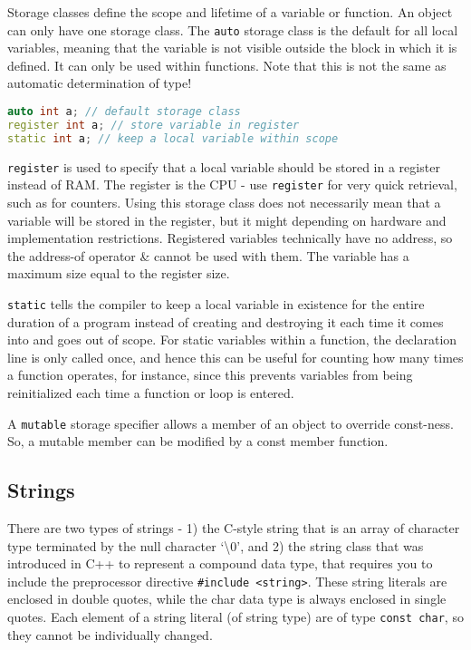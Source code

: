 \documentclass[10pt]{article}
\begin{document}
Storage classes define the scope and lifetime of a variable or function. An object can only have one storage class. The \texttt{auto} storage class is the default for all local variables, meaning that the variable is not visible outside the block in which it is defined. It can only be used within functions. Note that this is not the same as automatic determination of type!

\begin{lstlisting}[language=C++]
auto int a; // default storage class
register int a; // store variable in register
static int a; // keep a local variable within scope
\end{lstlisting}

\texttt{register} is used to specify that a local variable should be stored in a register instead of RAM. The register is the CPU - use \texttt{register} for very quick retrieval, such as for counters. Using this storage class does not necessarily mean that a variable will be stored in the register, but it might depending on hardware and implementation restrictions. Registered variables technically have no address, so the address-of operator \& cannot be used with them. The variable has a maximum size equal to the register size.

\texttt{static} tells the compiler to keep a local variable in existence for the entire duration of a program instead of creating and destroying it each time it comes into and goes out of scope. For static variables within a function, the declaration line is only called once, and hence this can be useful for counting how many times a function operates, for instance, since this prevents variables from being reinitialized each time a function or loop is entered.

A \texttt{mutable} storage specifier allows a member of an object to override const-ness. So, a mutable member can be modified by a const member function.

\subsection{Strings}

There are two types of strings - 1) the C-style string that is an array of character type terminated by the null character `\textbackslash0', and 2) the string class that was introduced in C++ to represent a compound data type, that requires you to include the preprocessor directive \texttt{\#include <string>}. These string literals are enclosed in double quotes, while the char data type is always enclosed in single quotes. Each element of a string literal (of string type) are of type \texttt{const char}, so they cannot be individually changed. 
\end{document}
